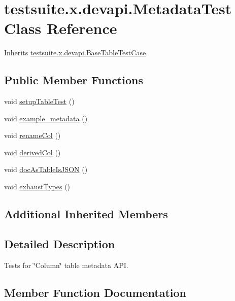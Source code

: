 \hypertarget{classtestsuite_1_1x_1_1devapi_1_1_metadata_test}{}\section{testsuite.\+x.\+devapi.\+Metadata\+Test Class Reference}
\label{classtestsuite_1_1x_1_1devapi_1_1_metadata_test}


Inherits \mbox{\hyperlink{classtestsuite_1_1x_1_1devapi_1_1_base_table_test_case}{testsuite.\+x.\+devapi.\+Base\+Table\+Test\+Case}}.

\subsection*{Public Member Functions}
\begin{DoxyCompactItemize}
\item 
void \mbox{\hyperlink{classtestsuite_1_1x_1_1devapi_1_1_metadata_test_aa25935980cc3f97ca8c9ca4fd31a615d}{setup\+Table\+Test}} ()
\item 
void \mbox{\hyperlink{classtestsuite_1_1x_1_1devapi_1_1_metadata_test_a2a3ac234f8781bff96dcf4509fd50e8b}{example\+\_\+metadata}} ()
\item 
void \mbox{\hyperlink{classtestsuite_1_1x_1_1devapi_1_1_metadata_test_a63df98020bbc9bb39c55754d5607b531}{rename\+Col}} ()
\item 
void \mbox{\hyperlink{classtestsuite_1_1x_1_1devapi_1_1_metadata_test_a932055ae5a58f54957748608955aab13}{derived\+Col}} ()
\item 
void \mbox{\hyperlink{classtestsuite_1_1x_1_1devapi_1_1_metadata_test_a8f79f58540380c4392ab69cbc4abb8eb}{doc\+As\+Table\+Is\+J\+S\+ON}} ()
\item 
void \mbox{\hyperlink{classtestsuite_1_1x_1_1devapi_1_1_metadata_test_a34826b6e8607c943adb6d708eb52fb8a}{exhaust\+Types}} ()
\end{DoxyCompactItemize}
\subsection*{Additional Inherited Members}


\subsection{Detailed Description}
Tests for \char`\"{}\+Column\char`\"{} table metadata A\+PI. 

\subsection{Member Function Documentation}
\mbox{\label{classtestsuite_1_1x_1_1devapi_1_1_metadata_test_a932055ae5a58f54957748608955aab13}} 
